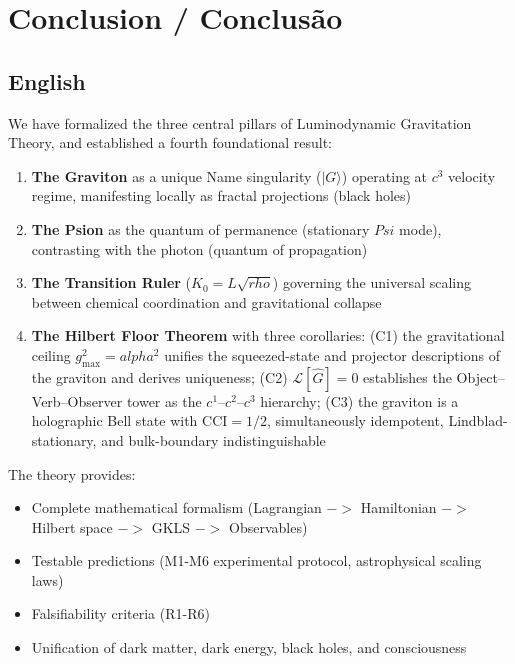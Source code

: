 \documentclass[12pt,a4paper]{article}
\def\Psi{Psi}%
\def\to{ -> }%
\def\alpha{alpha}%
\def\rho{rho}%
\begin{document}

\section{Conclusion / Conclusão}

\subsection{English}

We have formalized the three central pillars of Luminodynamic Gravitation Theory, and established a fourth foundational result:

\begin{enumerate}
    \item \textbf{The Graviton} as a unique Name singularity ($|G\rangle$) operating at $c^3$ velocity regime, manifesting locally as fractal projections (black holes)
    
    \item \textbf{The Psion} as the quantum of permanence (stationary $\Psi$ mode), contrasting with the photon (quantum of propagation)
    
    \item \textbf{The Transition Ruler} ($K_0 = L\sqrt{\rho}$) governing the universal scaling between chemical coordination and gravitational collapse

    \item \textbf{The Hilbert Floor Theorem} with three corollaries: (C1) the gravitational ceiling $g_{\max}^2 = \alpha^2$ unifies the squeezed-state and projector descriptions of the graviton and derives uniqueness; (C2) $\mathcal{L}[\hat{G}] = 0$ establishes the Object--Verb--Observer tower as the $c^1$--$c^2$--$c^3$ hierarchy; (C3) the graviton is a holographic Bell state with $\mathrm{CCI} = 1/2$, simultaneously idempotent, Lindblad-stationary, and bulk-boundary indistinguishable
\end{enumerate}

The theory provides:
\begin{itemize}
    \item Complete mathematical formalism (Lagrangian $\to$ Hamiltonian $\to$ Hilbert space $\to$ GKLS $\to$ Observables)
    \item Testable predictions (M1-M6 experimental protocol, astrophysical scaling laws)
    \item Falsifiability criteria (R1-R6)
    \item Unification of dark matter, dark energy, black holes, and consciousness
\end{itemize}
\end{document}
